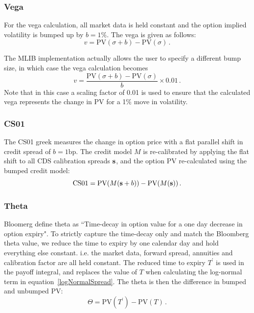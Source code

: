 \documentclass[11pt]{article}
\begin{document}
\subsubsection{Vega}

For the vega calculation, all market data is held constant and the option implied volatility is bumped up by $b=1\%$. The vega is given as follows:
\begin{equation}
v = \mbox{PV}(\sigma + b) - \mbox{PV}(\sigma) \,.
\end{equation}

The MLIB implementation actually allows the user to specify a different bump size, in which case the vega calculation becomes
\begin{equation}
v = \frac{\mbox{PV}(\sigma + b) - \mbox{PV}(\sigma)}{b} \times 0.01 \,.
\end{equation}
Note that in this case a scaling factor of 0.01 is used to ensure that the calculated vega represents the change in PV for a 1\% move in volatility.

\subsubsection{CS01}

The CS01 greek measures the change in option price with a flat parallel shift in credit spread of $b=1\mbox{bp}$. The credit model $M$ is re-calibrated by applying the flat shift to all CDS calibration spreads ${\bf s}$, and the option PV re-calculated using the bumped credit model:
\begin{equation}
\mbox{CS01} = \mbox{PV}(M({\bf s}+b)) - \mbox{PV}(M({\bf s})) \,.
\end{equation}

\subsubsection{Theta}

Bloomerg define theta as ``Time-decay in option value for a one day decrease in option expiry". To strictly capture the time-decay only and match the Bloomberg theta value, we reduce the time to expiry by one calendar day and hold everything else constant. i.e. the market data, forward spread, annuities and calibration factor are all held constant. The reduced time to expiry $T^\prime$ is used in the payoff integral, and replaces the value of $T$ when calculating the log-normal term in equation~\ref{logNormalSpread}. The theta is then the difference in bumped and unbumped PV:
\begin{equation}
\Theta = \mbox{PV}(T^\prime) - \mbox{PV}(T) \,.
\end{equation}




\end{document}
